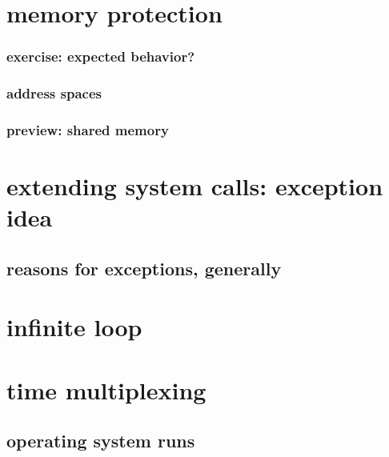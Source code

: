 \section{memory protection}

\subsubsection{exercise: expected behavior?}


\subsubsection{address spaces}


\subsubsection{preview: shared memory}


\section{extending system calls: exception idea}


\subsection{reasons for exceptions, generally}



\section{infinite loop}



\section{time multiplexing}


\subsection{operating system runs}


